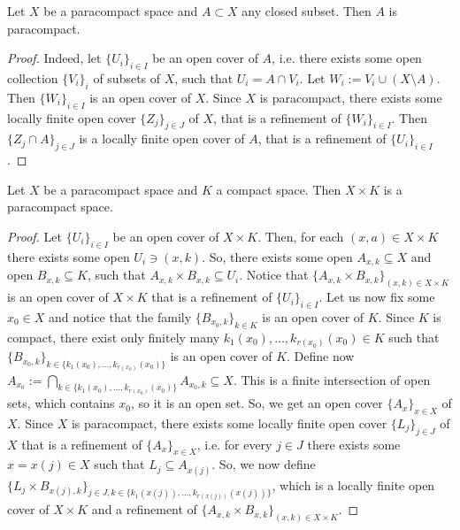 \begin{proposition}\label{prop:paracompact_closed_subset} Let $X$ be a paracompact space and $A\subset X$ any closed subset. Then $A$ is paracompact.
\end{proposition}
\begin{proof} Indeed, let $\{U_i\}_{i\in I}$ be an open cover of $A$, i.e. there exists some open collection $\{V_i\}_i$ of subsets of $X$, such that $U_i=A\cap V_i$. Let $W_i:=V_i\cup(X\setminus A)$. Then $\{W_i\}_{i\in I}$ is an open cover of $X$. Since $X$ is paracompact, there exists some locally finite open cover $\{Z_j\}_{j\in J}$ of $X$, that is a refinement of $\{W_i\}_{i\in I}$. Then $\{Z_j\cap A\}_{j\in J}$ is a locally finite open cover of $A$, that is a refinement of $\{U_i\}_{i\in I}$.
\end{proof}

\begin{proposition}\label{prop:paracompact_times_compact} Let $X$ be a paracompact space and $K$ a compact space. Then $X\times K$ is a paracompact space.
\end{proposition}
\begin{proof} Let $\{U_i\}_{i\in I}$ be an open cover of $X\times K$. Then, for each $(x,a)\in X\times K$ there exists some open $U_i\ni(x,k)$. So, there exists some open $A_{x,k}\subseteq X$ and open $B_{x,k}\subseteq K$, such that $A_{x,k}\times B_{x,k}\subseteq U_i$. Notice that $\{A_{x,k}\times B_{x,k}\}_{(x,k)\in X\times K}$ is an open cover of $X\times K$ that is a refinement of $\{U_i\}_{i\in I}$. Let us now fix some $x_0\in X$ and notice that the family $\{B_{x_0,k}\}_{k\in K}$ is an open cover of $K$. Since $K$ is compact, there exist only finitely many $k_1(x_0),\ldots,k_{r(x_0)}(x_0)\in K$ such that $\{B_{x_0,k}\}_{k\in\{k_1(x_0),\ldots,k_{r(x_0)}(x_0)\}}$ is an open cover of $K$. Define now $A_{x_0}:=\bigcap_{k\in\{k_1(x_0),\ldots,k_{r(x_0)}(x_0)\}}A_{x_0,k}\subseteq X$. This is a finite intersection of open sets, which contains $x_0$, so it is an open set. So, we get an open cover $\{A_x\}_{x\in X}$ of $X$. Since $X$ is paracompact, there exists some locally finite open cover $\{L_j\}_{j\in J}$ of $X$ that is a refinement of $\{A_x\}_{x\in X}$, i.e. for every $j\in J$ there exists some $x=x(j)\in X$ such that $L_j\subseteq A_{x(j)}$. So, we now define $\big\{L_j\times B_{x(j),k}\big\}_{j\in J, k\in\{k_1(x(j)),\ldots,k_{r(x(j))}(x(j))\}}$, which is a locally finite open cover of $X\times K$ and a refinement of $\{A_{x,k}\times B_{x,k}\}_{(x,k)\in X\times K}$.
\end{proof}

